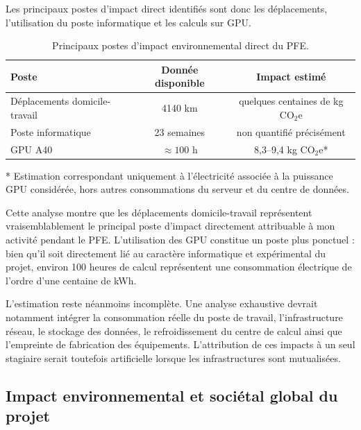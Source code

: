 \documentclass[12pt,a4paper,twoside]{article}
\begin{document}
Les principaux postes d'impact direct identifiés sont donc les déplacements, l'utilisation du poste informatique et les calculs sur GPU.

\begin{table}[htbp]
\centering
\caption{Principaux postes d'impact environnemental direct du PFE.}
\label{tab:rse_bilan_personnel}
\begin{tabular}{lcc}
\toprule
\textbf{Poste} & \textbf{Donnée disponible} & \textbf{Impact estimé} \\
\midrule
Déplacements domicile-travail & 4140 km & quelques centaines de kg CO$_2$e \\
Poste informatique & 23 semaines & non quantifié précisément \\
GPU A40 & $\approx 100$ h & 8,3--9,4 kg CO$_2$e* \\
\bottomrule
\end{tabular}

\vspace{0.2cm}
\begin{flushleft}
\footnotesize

* Estimation correspondant uniquement à l'électricité associée à la puissance GPU considérée, hors autres consommations du serveur et du centre de données.
  \end{flushleft}
  \end{table}

Cette analyse montre que les déplacements domicile-travail représentent vraisemblablement le principal poste d'impact directement attribuable à mon activité pendant le PFE. L'utilisation des GPU constitue un poste plus ponctuel : bien qu'il soit directement lié au caractère informatique et expérimental du projet, environ 100 heures de calcul représentent une consommation électrique de l'ordre d'une centaine de kWh.

L'estimation reste néanmoins incomplète. Une analyse exhaustive devrait notamment intégrer la consommation réelle du poste de travail, l'infrastructure réseau, le stockage des données, le refroidissement du centre de calcul ainsi que l'empreinte de fabrication des équipements. L'attribution de ces impacts à un seul stagiaire serait toutefois artificielle lorsque les infrastructures sont mutualisées.

\subsection{Impact environnemental et sociétal global du projet}
\label{subsec:rse_impact_global}
\end{document}
